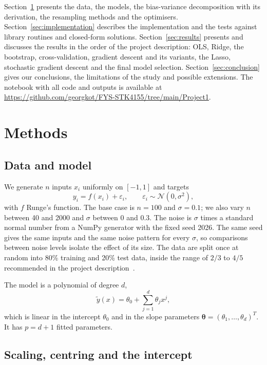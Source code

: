 \documentclass[aps,reprint,amsmath,amssymb,nofootinbib,floatfix]{revtex4-2}
\newcommand{\repourl}{\url{https://github.com/georgkot/FYS-STK4155/tree/main/Project1}}
\begin{document}
Section~\ref{sec:methods} presents the data, the models, the bias-variance decomposition with its
derivation, the resampling methods and the optimisers. Section~\ref{sec:implementation} describes
the implementation and the tests against library routines and closed-form solutions.
Section~\ref{sec:results} presents and discusses the results in the order of the project
description: OLS, Ridge, the bootstrap, cross-validation, gradient descent and its variants, the
Lasso, stochastic gradient descent and the final model selection. Section~\ref{sec:conclusion}
gives our conclusions, the limitations of the study and possible extensions. The notebook with all
code and outputs is available at \repourl.

\section{Methods}\label{sec:methods}

\subsection{Data and model}\label{sec:data}

We generate $n$ inputs $x_i$ uniformly on $[-1,1]$ and targets
\begin{equation}
  y_i=f(x_i)+\varepsilon_i,\qquad \varepsilon_i\sim\mathcal N(0,\sigma^2),
  \label{eq:data}
\end{equation}
with $f$ Runge's function. The base case is $n=100$ and $\sigma=0.1$; we also vary $n$ between 40
and 2000 and $\sigma$ between 0 and 0.3. The noise is $\sigma$ times a standard normal number from
a NumPy generator with the fixed seed 2026. The same seed gives the same inputs and the same noise
pattern for every $\sigma$, so comparisons between noise levels isolate the effect of its size.
The data are split once at random into 80\% training and 20\% test data, inside the range of
$2/3$ to $4/5$ recommended in the project description~\cite{project1}.

The model is a polynomial of degree $d$,
\begin{equation}
  \tilde y(x)=\theta_0+\sum_{j=1}^{d}\theta_jx^j,
  \label{eq:model}
\end{equation}
which is linear in the intercept $\theta_0$ and in the slope parameters
$\bm\theta=(\theta_1,\dots,\theta_d)^T$. It has $p=d+1$ fitted parameters.

\subsection{Scaling, centring and the intercept}\label{sec:scaling}
\end{document}
